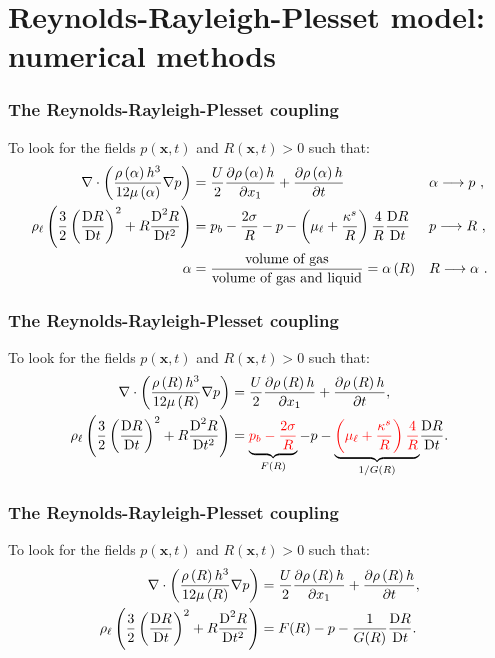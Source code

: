 \documentclass[10pt,aspectratio=169]{beamer}
\begin{document}
\setcounter{showSlideNumbers}{0}
\section{Reynolds-Rayleigh-Plesset model: numerical methods}
\setcounter{showSlideNumbers}{1}

\begin{frame}
\frametitle{The Reynolds-Rayleigh-Plesset coupling}

To look for the fields $p(\mathbf{x},t)$ and $R(\mathbf{x},t)>0$ such that:
\begin{align*}
\nabla\cdot\left(\frac{\rho\left(\alpha\right) h^3}{12\mu\left(\alpha\right) }\nabla p \right)&=\frac{U}{2}\frac{\partial \rho\left(\alpha\right) h}{\partial x_1}+\frac{\partial \rho\left(\alpha\right) h}{\partial t}&&\alpha \longrightarrow p~,\\
\rho_\ell\left(\frac{3}{2}\left(\frac{\mbox{D} R}{\mbox{D} t}\right)^2+R\frac{\mbox{D}^2 R}{\mbox{D} {t}^2}\right)&=p_b-\frac{2\sigma}{R}-p-\left(\mu_\ell+\frac{\kappa^s}{R}\right)\frac{4}{R}\frac{\mbox{D} R}{\mbox{D} t}&&p\longrightarrow R~,\\
\alpha&=\frac{\mbox{volume of gas}}{\mbox{volume of gas and liquid}}=\alpha\left(R\right)&&R\longrightarrow \alpha~.
\end{align*}
\end{frame} 

\begin{frame}[noframenumbering]
\frametitle{The Reynolds-Rayleigh-Plesset coupling}

To look for the fields $p(\mathbf{x},t)$ and $R(\mathbf{x},t)>0$ such that:
\begin{align*}
\nabla\cdot\left(\frac{\rho\left(R\right) h^3}{12\mu\left(R\right) }\nabla p \right)&=\frac{U}{2}\frac{\partial \rho\left(R\right) h}{\partial x_1}+\frac{\partial \rho\left(R\right) h}{\partial t},\\
\rho_\ell\left(\frac{3}{2}\left(\frac{\mbox{D} R}{\mbox{D} t}\right)^2+R\frac{\mbox{D}^2 R}{\mbox{D} {t}^2}\right)&=\underbrace{{\color{red}p_b-\frac{2\sigma}{R}}}_{F(R)}-p-{\underbrace{\color{red}\left(\mu_\ell+\frac{\kappa^s}{R}\right)\frac{4}{R}}_{1/G(R)}}\frac{\mbox{D} R}{\mbox{D} t}.
\end{align*}
\end{frame} 

\begin{frame}[noframenumbering]
\frametitle{The Reynolds-Rayleigh-Plesset coupling}

To look for the fields $p(\mathbf{x},t)$ and $R(\mathbf{x},t)>0$ such that:
\begin{align*}
\nabla\cdot\left(\frac{\rho\left(R\right) h^3}{12\mu\left(R\right) }\nabla p \right)&=\frac{U}{2}\frac{\partial \rho\left(R\right) h}{\partial x_1}+\frac{\partial \rho\left(R\right) h}{\partial t},\\
\rho_\ell\left(\frac{3}{2}\left(\frac{\mbox{D} R}{\mbox{D} t}\right)^2+R\frac{\mbox{D}^2 R}{\mbox{D} {t}^2}\right)&=F(R)-p-\frac{1}{G(R)}\frac{\mbox{D} R}{\mbox{D} t}.
\end{align*}
\end{frame} 
\end{document}
